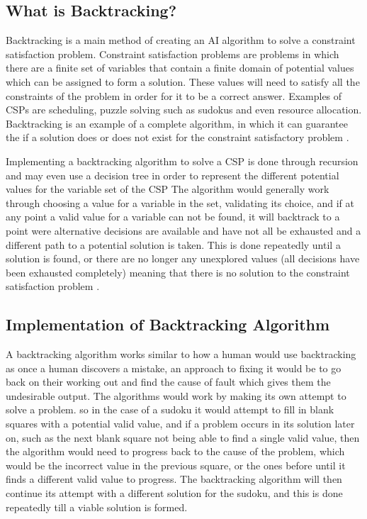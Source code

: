 \documentclass[]{final_report}
\begin{document}
\subsection{What is Backtracking?}

Backtracking is a main method of creating an AI algorithm to solve a constraint satisfaction problem. Constraint satisfaction problems are problems in which there are a finite set of variables that contain a finite domain of potential values which can be assigned to form a solution. These values will need to satisfy all the constraints of the problem in order for it to be a correct answer. Examples of CSPs are scheduling, puzzle solving such as sudokus and even resource allocation. Backtracking is an example of a complete algorithm, in which it can guarantee the if a solution does or does not exist for the constraint satisfactory problem \cite{Brailsford1999}. 

Implementing a backtracking algorithm to solve a CSP is done through recursion and may even use a decision tree in order to represent the different potential values for the variable set of the CSP \cite{vanBeek2006} 
The algorithm would generally work through choosing a value for a variable in the set, validating its choice, and if at any point a valid value for a variable can not be found, it will backtrack to a point were alternative decisions are available and have not all be exhausted and a different path to a potential solution is taken. This is done repeatedly until a solution is found, or there are no longer any unexplored values (all decisions have been exhausted completely) meaning that there is no solution to the constraint satisfaction problem \cite{Melanie2024}. 

\subsection{Implementation of Backtracking Algorithm}

A backtracking algorithm works similar to how a human would use backtracking as once a human discovers a mistake, an approach to fixing it would be to go back on their working out and find the cause of fault which gives them the undesirable output. The algorithms would work by making its own attempt to solve a problem. so in the case of a sudoku it would attempt to fill in blank squares with a potential valid value, and if a problem occurs in its solution later on, such as the next blank square not being able to find a single valid value, then the algorithm would need to progress back to the cause of the problem, which would be the incorrect value in the previous square, or the ones before until it finds a different valid value to progress. The backtracking algorithm will then continue its attempt with a different solution for the sudoku, and this is done repeatedly till a viable solution is formed.  
\end{document}
